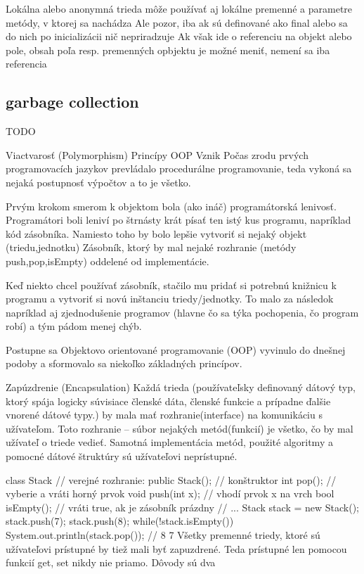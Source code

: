 		Lokálna alebo anonymná trieda môže používať aj lokálne premenné a parametre metódy, v ktorej sa nachádza
		Ale pozor, iba ak sú definované ako final alebo sa do nich po inicializácii nič nepriradzuje
		Ak však ide o referenciu na objekt alebo pole, obsah poľa resp. premenných opbjektu je možné meniť, nemení sa iba referencia


	\subsection{garbage collection}
		TODO











Viactvarosť (Polymorphism)
Princípy OOP
Vznik
Počas zrodu prvých programovacích jazykov prevládalo procedurálne programovanie, teda vykoná sa nejaká postupnosť výpočtov a to je všetko.

Prvým krokom smerom k objektom bola (ako ináč) programátorská lenivosť. Programátori boli leniví po štrnásty krát písať ten istý kus programu, napríklad kód zásobníka. Namiesto toho by bolo lepšie vytvoriť si nejaký objekt (triedu,jednotku) Zásobník, ktorý by mal nejaké rozhranie (metódy push,pop,isEmpty) oddelené od implementácie.

Keď niekto chcel používať zásobník, stačilo mu pridať si potrebnú knižnicu k programu a vytvoriť si novú inštanciu triedy/jednotky. To malo za následok napríklad aj zjednodušenie programov (hlavne čo sa týka pochopenia, čo program robí) a tým pádom menej chýb.

Postupne sa Objektovo orientované programovanie (OOP) vyvinulo do dnešnej podoby a sformovalo sa niekoľko základných princípov.

Zapúzdrenie (Encapsulation)
Každá trieda (používateľsky definovaný dátový typ, ktorý spája logicky súvisiace členské dáta, členské funkcie a prípadne ďalšie vnorené dátové typy.) by mala mať rozhranie(interface) na komunikáciu s užívateľom. Toto rozhranie – súbor nejakých metód(funkcií) je všetko, čo by mal užívateľ o triede vedieť. Samotná implementácia metód, použité algoritmy a pomocné dátové štruktúry sú užívateľovi neprístupné.

class Stack {
    // verejné rozhranie:
    public Stack(); // konštruktor
    int pop(); // vyberie a vráti horný prvok
    void push(int x); // vhodí prvok x na vrch
    bool isEmpty(); // vráti true, ak je zásobník prázdny
}
// ...
{
    Stack stack = new Stack();
    stack.push(7);
    stack.push(8);
    while(!stack.isEmpty()) System.out.println(stack.pop());
    // 8 7    
}
Všetky premenné triedy, ktoré sú užívateľovi prístupné by tiež mali byť zapuzdrené. Teda prístupné len pomocou funkcií get, set nikdy nie priamo. Dôvody sú dva

